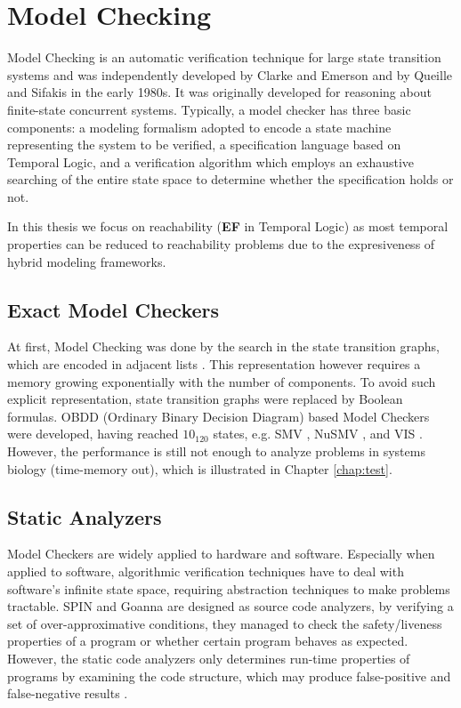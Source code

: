 \section{Model Checking}
Model Checking is an automatic verification technique for large state transition systems and was independently developed by Clarke and Emerson \cite{clarke1981design} and by Queille and Sifakis \cite{queille1982specification} in the early 1980s. It was originally developed for reasoning about finite-state concurrent systems.
Typically, a model checker has three basic components: a modeling formalism adopted to encode a state machine representing the system to be verified, a specification language based on Temporal Logic, and a verification algorithm \cite{clarke20142} which employs an exhaustive searching of the entire state space to determine whether the specification holds or not.

In this thesis we focus on reachability (\textbf{EF} in Temporal Logic) as most temporal properties can be reduced to reachability problems due to the expresiveness of hybrid modeling frameworks.

\subsection{Exact Model Checkers}
At first, Model Checking was done by the search in the state transition graphs, which are encoded in adjacent lists \cite{clarke1981design}.
This representation however requires a memory growing exponentially with the number of components.
To avoid such explicit representation, state transition graphs were replaced by Boolean formulas.
OBDD (Ordinary Binary Decision Diagram) based Model Checkers were developed, having reached $10_{120}$ states, e.g.
SMV \cite{mcmillan1993symbolic}, NuSMV \cite{cimatti2000nusmv}, and VIS \cite{brayton1996vis}.
However, the performance is still not enough to analyze problems in systems biology (time-memory out), which is illustrated in Chapter \ref{chap:test}.  

\subsection{Static Analyzers}
Model Checkers are widely applied to hardware and software.
Especially when applied to software, algorithmic verification techniques have
to deal with software’s infinite state space, requiring abstraction techniques to make problems tractable.
SPIN \cite{holzmann1997model} and Goanna \cite{fehnker2006goanna} are designed as source code analyzers, by verifying a set of over-approximative conditions, they managed to check the safety/liveness properties of a program or whether certain program behaves as expected. 
However, the static code analyzers only determines run-time properties of programs by examining the code structure, which may produce false-positive and false-negative results \cite{vorobyov2010comparing}.

